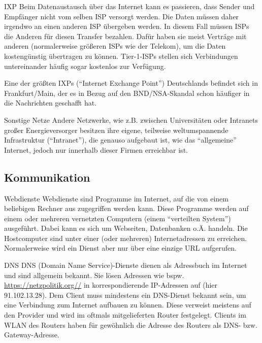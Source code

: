 \documentclass[utf8]{beamer}
\begin{document}
	\begin{frame}{IXP}
		Beim Datenaustausch über das Internet kann es passieren, dass Sender und Empfänger nicht vom selben ISP versorgt werden. Die Daten müssen daher irgendwo an einen anderen ISP übergeben werden. In diesem Fall müssen ISPs die Anderen für diesen Transfer bezahlen. Dafür haben sie meist Verträge mit anderen (normalerweise größeren ISPs wie der Telekom), um die Daten kostengünstig übertragen zu können. Tier-1-ISPs stellen sich Verbindungen untereinander häufig sogar kostenlos zur Verfügung.
		
		Eine der größten IXPs (\enquote{Internet Exchange Point}) Deutschlands befindet sich in Frankfurt/Main, der es in Bezug auf den BND/NSA-Skandal schon häufiger in die Nachrichten geschafft hat.
	\end{frame}
	
	\begin{frame}{Sonstige Netze}
		Andere Netzwerke, wie z.B. zwischen Universitäten oder Intranets großer Energieversorger besitzen ihre eigene, teilweise weltumspannende Infrastruktur (\enquote{Intranet}), die genauso aufgebaut ist, wie das \enquote{allgemeine} Internet, jedoch nur innerhalb dieser Firmen erreichbar ist.
	\end{frame}
	
	\subsection{Kommunikation}
	\begin{frame}{Webdienste}
		Webdienste sind Programme im Internet, auf die von einem beliebigen Rechner aus zugegriffen werden kann. Diese Programme werden auf einem oder mehreren vernetzten Computern (einem \enquote{verteilten System}) ausgeführt. Dabei kann es sich um Webseiten, Datenbanken o.Ä. handeln. Die Hostcomputer sind unter einer (oder mehreren) Internetadressen zu erreichen. Normalerweise wird ein Dienst aber nur über eine einzige URL aufgerufen.
	\end{frame}
	
	\begin{frame}{DNS}
		DNS (Domain Name Service)-Dienste dienen als Adressbuch im Internet und sind allgemein bekannt. Sie lösen Adressen wie bspw. \url{https://netzpolitik.org//} in korrespondierende IP-Adressen auf (hier 91.102.13.28). Dem Client muss mindestens ein DNS-Dienst bekannt sein, um eine Verbindung zum Internet aufbauen zu können. Diese verweist meistens auf den Provider und wird im oftmals mitgelieferten Router festgelegt. Clients im WLAN des Routers haben für gewöhnlich die Adresse des Routers als DNS- bzw. Gateway-Adresse.
	\end{frame}
	
\end{document}
